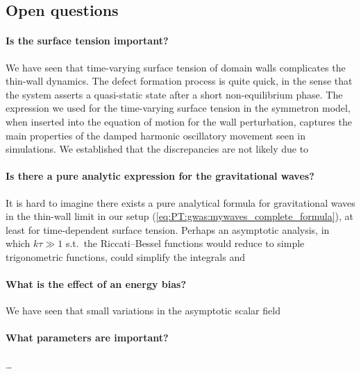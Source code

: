 

\subsection{Open questions}

    \paragraph{Is the surface tension important?} %
    We have seen that time-varying surface tension of domain walls complicates the thin-wall dynamics. The defect formation process is quite quick, in the sense that the system asserts a quasi-static state after a short non-equilibrium phase. The expression we used for the time-varying surface tension in the symmetron model, when inserted into the equation of motion for the wall perturbation, captures the main properties of the damped harmonic oscillatory movement seen in simulations. We established that the discrepancies are not likely due to \blahblah {}


    \paragraph{Is there a pure analytic expression for the gravitational waves?} %
    It is hard to imagine there exists a pure analytical formula for gravitational waves in the thin-wall limit in our setup (\cref{eq:PT:gwas:mywaves_complete_formula}), at least for time-dependent surface tension. Perhaps an asymptotic analysis, in which $k\tau \gg 1$ s.t.~the Riccati--Bessel functions would reduce to simple trigonometric functions, could simplify the integrals and \blahblah
    

    \paragraph{What is the effect of an energy bias?} %
    We have seen that small variations in the asymptotic scalar field 


    \paragraph{What parameters are important?} %
    \dots 



